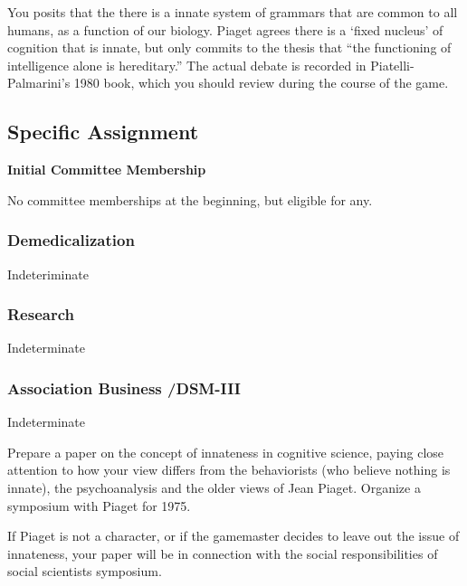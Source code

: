 \begin{refsection}
You posits that the there is a innate system of grammars that are common to all humans, as a function of our biology. Piaget agrees there is a `fixed nucleus' of cognition that is innate, but only commits to the thesis that “the functioning of intelligence alone is hereditary.” The actual debate is recorded in Piatelli-Palmarini's 1980 book, which you should review during the course of the game.

\subsection{Specific Assignment}
\label{specificassignment}

\textbf{Initial Committee Membership}

No committee memberships at the beginning, but eligible for any.

\subsubsection{Demedicalization}
\label{demedicalization}

Indeteriminate

\subsubsection{Research}
\label{research}

Indeterminate

\subsubsection{Association Business \slash  DSM-III}
\label{associationbusinessdsm-iii}

Indeterminate

\begin{writingtask}[Chomsky]\label{writingtask:chomsky}
Prepare a paper on the concept of innateness in cognitive science, paying close attention to how your view differs from the behaviorists (who believe nothing is innate), the psychoanalysis and the older views of Jean Piaget. Organize a symposium with Piaget for 1975.
\end{writingtask}

\begin{writingtask}[Chomsky]\label{writingtask:chomskyB}
If Piaget is not a character, or if the gamemaster decides to leave out the issue of innateness, your paper will be in connection with the social responsibilities of social scientists symposium.
\end{writingtask}


\end{refsection}
